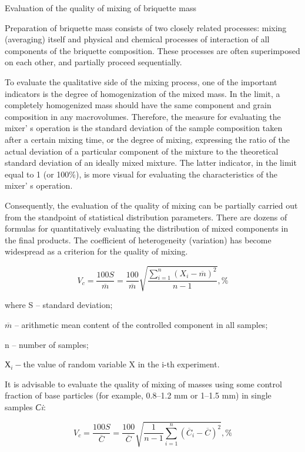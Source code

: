\begin{multicols}{2}
Evaluation of the quality of mixing of briquette mass

Preparation of briquette mass consists of two closely related processes:
mixing (averaging) itself and physical and chemical processes of
interaction of all components of the briquette composition. These
processes are often superimposed on each other, and partially proceed
sequentially.

To evaluate the qualitative side of the mixing process, one of the
important indicators is the degree of homogenization of the mixed mass.
In the limit, a completely homogenized mass should have the same
component and grain composition in any macrovolumes. Therefore, the
measure for evaluating the mixer' s operation is the
standard deviation of the sample composition taken after a certain
mixing time, or the degree of mixing, expressing the ratio of the actual
deviation of a particular component of the mixture to the theoretical
standard deviation of an ideally mixed mixture. The latter indicator, in
the limit equal to 1 (or 100\%), is more visual for evaluating the
characteristics of the mixer' s operation.

Consequently, the evaluation of the quality of mixing can be partially
carried out from the standpoint of statistical distribution parameters.
There are dozens of formulas for quantitatively evaluating the
distribution of mixed components in the final products. The coefficient
of heterogeneity (variation) has become widespread as a criterion for
the quality of mixing.

\begin{equation*}
    V_{c} = \frac{100S}{\overline{m}} = \frac{100}{\overline{m}} 
    \sqrt{\frac{\sum_{i = 1}^{n} \left( X_{i} - \overline{m} \right)^{2}}{n - 1}}, \%
\end{equation*}

where S -- standard deviation;

\(\overline{m}\) -- arithmetic mean content of the controlled component
in all samples;

n -- number of samples;

\(Х_{i} -\)the value of random variable X in the i-th experiment.

It is advisable to evaluate the quality of mixing of masses using some
control fraction of base particles (for example, 0.8--1.2 mm or 1--1.5
mm) in single samples \emph{Сi}:

\begin{equation*}
    V_{c} = \frac{100S}{\overline{C}} = \frac{100}{\overline{C}} 
    \sqrt{\frac{1}{n - 1} \sum_{i = 1}^{n} \left( \overline{C}_{i} - \overline{C} \right)^{2}}, \%
\end{equation*}


\end{multicols}
